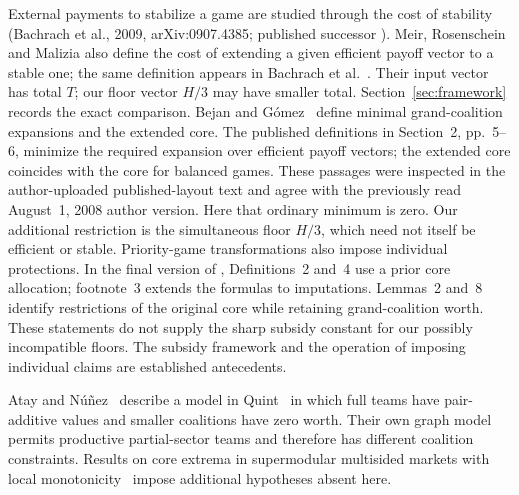 \documentclass[11pt]{article}
\theoremstyle{remark}
\begin{document}
External payments to stabilize a game are studied through the cost of
stability (Bachrach et al., 2009, arXiv:0907.4385; published successor
\citep{Bachrach2018}). Meir, Rosenschein and Malizia
\citep[Section~2.2]{Meir2011} also define the cost of extending a given
efficient payoff vector to a stable one; the same definition appears in
Bachrach et al.~\citep[Section~5]{Bachrach2018}. Their input vector has total $T$;
our floor vector $H/3$ may have smaller total. Section~\ref{sec:framework}
records the exact comparison. Bejan and G\'omez~\citep{BejanGomez2009} define minimal grand-coalition
expansions and the extended core. The published definitions in Section~2, pp.~5--6, minimize the required
expansion over efficient payoff vectors; the extended core coincides with the
core for balanced games. These passages were inspected in the author-uploaded
published-layout text and agree with the previously read August~1, 2008 author
version. Here that ordinary minimum is zero. Our additional restriction is the
simultaneous floor $H/3$, which need not itself be efficient or stable.
Priority-game transformations also impose individual protections.
In the final version of \citet{Priority2024}, Definitions~2 and~4 use a
prior core allocation; footnote~3 extends the formulas to imputations.
Lemmas~2 and~8 identify restrictions of the original core while retaining
grand-coalition worth. These statements do not supply the sharp
subsidy constant for our possibly incompatible floors. The subsidy framework
and the operation of imposing individual claims are established antecedents.

Atay and N\'u\~nez~\citep[p.~273]{AtayNunez2019} describe a model in
Quint~\citep{Quint1991} in which full teams have pair-additive values and
smaller coalitions have zero worth. Their own graph model permits productive
partial-sector teams and therefore has different coalition constraints.
Results on core extrema in supermodular multisided markets with local
monotonicity~\citep{Martinez2026} impose additional hypotheses absent here.
\end{document}
